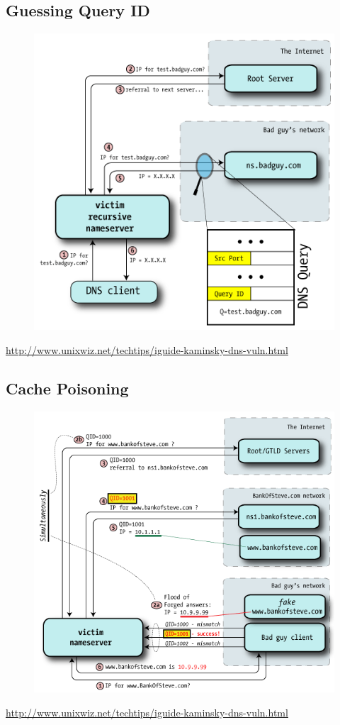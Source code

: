 \subsection{Guessing Query ID}
\begin{figure}[H]
    \includegraphics[scale=0.5]{lazy/guessing-query-id.png}
\end{figure}
\url{http://www.unixwiz.net/techtips/iguide-kaminsky-dns-vuln.html}
\subsection{Cache Poisoning}
\begin{figure}[H]
    \includegraphics[scale=0.5]{lazy/cache-poisoning.png}
\end{figure}
\url{http://www.unixwiz.net/techtips/iguide-kaminsky-dns-vuln.html}
